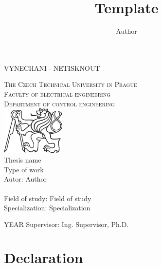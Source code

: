 \documentclass[a4paper, twoside, 12pt]{report}
\title{Template}
\author{Author}
\begin{document}
\null\thispagestyle{empty}
VYNECHANI - NETISKNOUT
\newpage


\begin{titlepage}
\begin{center}
\thispagestyle{empty}

\textsc{\Huge{The Czech Technical University in Prague}\\
\Large{Faculty of electrical engineering}\\
\Large{Department of control engineering}
}\\
\includegraphics[width=120px]{images/ctulogo.pdf}\\
\Huge{Thesis name}\\
\Large{Type of work}
\\Autor: Author\\~\\
Field of study: Field of study \\
Specialization: Specialization
\end{center}
{\large YEAR \hfill Supervisor: Ing. Supervisor, Ph.D.}

\end{titlepage}

\newpage
\null\thispagestyle{empty}



\newpage

\newpage
\null\thispagestyle{empty}
\newpage


%
\chapter*{Declaration}
\setcounter{page}{5}
\thispagestyle{empty}
\vspace{18cm}
\end{document}
